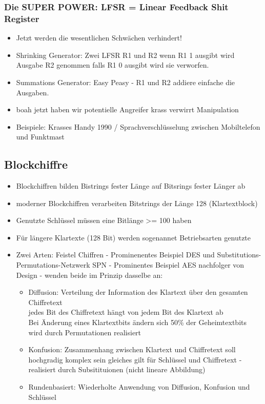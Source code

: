 \documentclass[a4paper,10pt]{scrartcl}
\begin{document}
  \subsubsection{Die SUPER POWER: LFSR = Linear Feedback Shit Register}
 \begin{itemize}
  \item Jetzt werden die wesentlichen Schwächen verhindert!
  \item Shrinking Generator: Zwei LFSR R1 und R2 wenn R1 1 ausgibt wird Ausgabe R2 genommen falls R1 0 ausgibt wird sie verworfen.
  \item Summations Generator: Easy Peasy - R1 und R2 addiere einfache die Ausgaben.
  \item boah jetzt haben wir potentielle Angreifer krass verwirrt Manipulation
  \item Beispiele: Krasses Handy 1990 / Sprachverschlüsselung zwischen Mobiltelefon und Funktmast
  
 
 \end{itemize}

 \subsection{Blockchiffre}
 
  \begin{itemize}
   \item Blockchiffren bilden Bistrings fester Länge auf Bitsrings fester Länger ab
   \item moderner Blockchiffren verarbeiten Bitstrings der Länge 128 (Klartextblock)
   \item Genutzte Schlüssel müssen eine Bitlänge >= 100 haben 
   \item Für längere Klartexte (128 Bit) werden sogenannet Betriebsarten genutzte
   \item Zwei Arten: Feistel Chiffren - Prominenentes Beispiel DES und Substitutions-Permutations-Netzwerk SPN - Prominentes Beispiel AES nachfolger von Design -
   wenden beide im Prinzip dasselbe an: 
   \begin{itemize}
   \item Diffusion: Verteilung der Information des Klartext über den gesamten Chiffretext\\
    jedes Bit des Chiffretext hängt von jedem Bit des Klartext ab\\
    Bei Änderung eines Klartextbits ändern sich 50\% der Geheimtextbits\\
    wird durch Permutationen realisiert
   \item Konfusion: Zusammenhang zwischen Klartext und Chiffretext soll hochgradig komplex sein
   gleiches gilt für Schlüssel und Chiffretext
   -realisiert durch Subsitituionen (nicht lineare Abbildung)
   \item Rundenbasiert: Wiederholte Anwendung von Diffusion, Konfusion und Schlüssel
   \end{itemize}

  \end{itemize}
  
\end{document}
